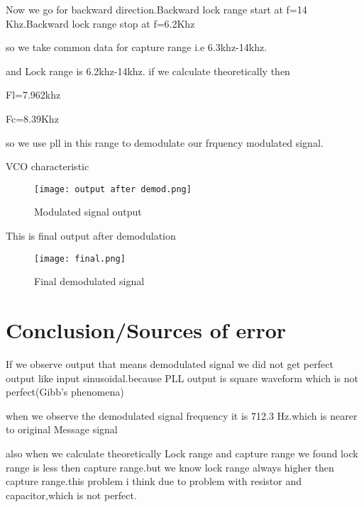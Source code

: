\documentclass{article}
\begin{document}
Now we go for backward direction.Backward lock range start at f=14 Khz.Backward lock range stop at f=6.2Khz

so we take common data for capture range i.e 6.3khz-14khz.\par
and Lock range is 6.2khz-14khz.
if we calculate theoretically then\par
 Fl=7.962khz  \par
 Fc=8.39Khz  \par
so we use pll in this range to demodulate our frquency modulated signal.

VCO characteristic

\begin{figure*}[h]
	\centering
	\texttt{[image: output after demod.png]}
	\caption{Modulated signal output}
	\label{FBD}
\end{figure*}

This is final output after demodulation

\begin{figure*}[h]
	\centering
	\texttt{[image: final.png]}
	\caption{Final demodulated signal}
	\label{FBD}
\end{figure*}

\section{Conclusion/Sources of error}
 If we observe output that means demodulated signal we did not get perfect output like input sinusoidal.because PLL output is square waveform which is not perfect(Gibb's phenomena)\par when we observe the demodulated signal frequency it is 712.3 Hz.which is nearer to original Message signal\par
 also when we calculate theoretically Lock range and capture range we found lock range is less then capture range.but we know lock range always higher then capture range.this problem i think due to problem with resistor and capacitor,which is not perfect.
 
 
\end{document}
